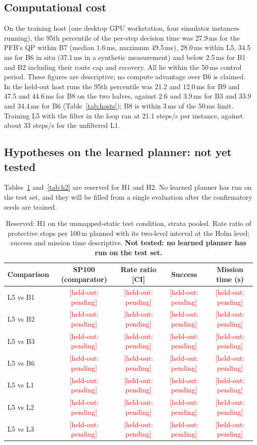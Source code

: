 \documentclass[11pt]{article}
\newcommand{\pending}[1][held-out: pending]{\textcolor{red}{[#1]}}
\theoremstyle{definition}
\begin{document}
\subsection{Computational cost}
On the training host (one desktop GPU workstation, four simulator instances running), the 95th percentile
of the per-step decision time was 27.9\,ms for the PFB's QP within B7 (median 1.6\,ms, maximum 49.5\,ms),
28.0\,ms within L5, 34.5\,ms for B6 in situ (37.1\,ms in a synthetic measurement) and below 2.5\,ms for B1
and B2 including their route cap and recovery. All lie within the 50\,ms control period. These figures are
descriptive; no compute advantage over B6 is claimed. In the held-out host runs the 95th percentile was 21.2 and 12.0\,ms
for B9 and 47.5 and 44.6\,ms for B8 on the two halves, against 2.6 and 3.9\,ms for B3 and 33.9 and 34.4\,ms for B6
(Table~\ref{tab:hosts}); B8 is within 3\,ms of the 50\,ms limit. Training L5 with the filter in the loop ran at 21.1
steps/s per instance, against about 33 steps/s for the unfiltered L1.

\subsection{Hypotheses on the learned planner: not yet tested}
Tables~\ref{tab:h1} and~\ref{tab:h2} are reserved for H1 and H2. No learned planner has run on the test set, and they
will be filled from a single evaluation after the confirmatory seeds are trained.

\begin{table}[!htbp]
\centering
\caption{Reserved: H1 on the unmapped-static test condition, strata pooled. Rate ratio of protective stops per
100\,m planned with its two-level interval at the Holm level; success and mission time descriptive. \textbf{Not
tested: no learned planner has run on the test set.}}
\label{tab:h1}
\small\renewcommand{\pending}{\textcolor{red}{[pending]}}
\begin{tabular}{lcccc}
\toprule
Comparison & SP100 (comparator) & Rate ratio [CI] & Success & Mission time (s)\\
\midrule
L5 vs B1 & \pending & \pending & \pending & \pending\\
L5 vs B2 & \pending & \pending & \pending & \pending\\
L5 vs B3 & \pending & \pending & \pending & \pending\\
L5 vs B6 & \pending & \pending & \pending & \pending\\
L5 vs L1 & \pending & \pending & \pending & \pending\\
L5 vs L2 & \pending & \pending & \pending & \pending\\
L5 vs L3 & \pending & \pending & \pending & \pending\\
\bottomrule
\end{tabular}
\end{table}
\end{document}
